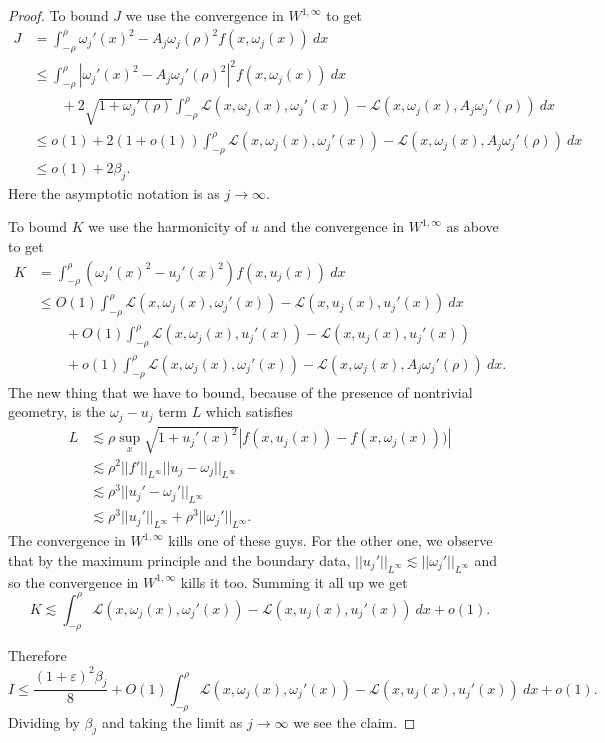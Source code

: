 \documentclass[reqno,12pt,letterpaper]{amsart}
\theoremstyle{definition}
\numberwithin{equation}{section}
\begin{document}
\begin{proof}
To bound $J$ we use the convergence in $W^{1, \infty}$ to get
\begin{align*}
J &= \int_{-\rho}^\rho \omega_j'(x)^2 - A_j \omega_j(\rho)^2f(x, \omega_j(x))  ~dx \\
&\leq \int_{-\rho}^\rho |\omega_j'(x)^2 - A_j \omega_j'(\rho)^2|^2f(x, \omega_j(x))  ~dx \\
&\qquad+ 2\sqrt{1 + \omega_j'(\rho)}\int_{-\rho}^\rho \mathscr L(x, \omega_j(x), \omega_j'(x)) - \mathscr L(x, \omega_j(x), A_j\omega_j'(\rho)) ~dx\\
&\leq o(1) + 2(1 + o(1)) \int_{-\rho}^\rho \mathscr L(x, \omega_j(x), \omega_j'(x)) - \mathscr L(x, \omega_j(x), A_j\omega_j'(\rho)) ~dx \\
&\leq o(1) + 2\beta_j.\end{align*}
Here the asymptotic notation is as $j \to \infty$.

To bound $K$ we use the harmonicity of $u$ and the convergence in $W^{1, \infty}$ as above to get
\begin{align*}
K &= \int_{-\rho}^\rho (\omega_j'(x)^2 - u_j'(x)^2)f(x, u_j(x)) ~dx \\
&\leq O(1) \int_{-\rho}^\rho \mathscr L(x, \omega_j(x), \omega_j'(x)) - \mathscr L(x, u_j(x), u_j'(x)) ~dx \\
&\qquad + O(1) \int_{-\rho}^\rho \mathscr L(x, \omega_j(x), u_j'(x)) - \mathscr L(x, u_j(x), u_j'(x)) \\
&\qquad + o(1) \int_{-\rho}^\rho \mathscr L(x, \omega_j(x), \omega_j'(x)) - \mathscr L(x, \omega_j(x), A_j\omega_j'(\rho)) ~dx.
\end{align*}
The new thing that we have to bound, because of the presence of nontrivial geometry, is the $\omega_j - u_j$ term $L$ which satisfies
\begin{align*}
L &\lesssim \rho \sup_x \sqrt{1 + u_j'(x)^2} |f(x, u_j(x)) - f(x, \omega_j(x)))| \\
&\lesssim \rho^2 ||f'||_{L^\infty} ||u_j - \omega_j||_{L^\infty} \\
&\lesssim \rho^3 ||u_j' - \omega_j'||_{L^\infty} \\
&\lesssim \rho^3 ||u_j'||_{L^\infty} + \rho^3 ||\omega_j'||_{L^\infty}.
\end{align*}
The convergence in $W^{1, \infty}$ kills one of these guys. For the other one, we observe that by the maximum principle and the boundary data, $||u_j'||_{L^\infty} \lesssim ||\omega_j'||_{L^\infty}$ and so the convergence in $W^{1, \infty}$ kills it too.
Summing it all up we get
$$K \lesssim \int_{-\rho}^\rho \mathscr L(x, \omega_j(x), \omega_j'(x)) - \mathscr L(x, u_j(x), u_j'(x)) ~dx + o(1).$$

Therefore
$$I \leq \frac{(1 + \varepsilon)^2\beta_j}{8} + O(1)\int_{-\rho}^\rho \mathscr L(x, \omega_j(x), \omega_j'(x)) - \mathscr L(x, u_j(x), u_j'(x)) ~dx + o(1).$$
Dividing by $\beta_j$ and taking the limit as $j \to \infty$ we see the claim.
\end{proof}
\end{document}
